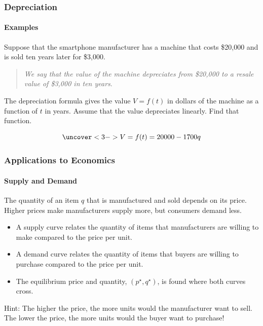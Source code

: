 \documentclass[9pt,xcolor=x11names,compress]{beamer}
\begin{document}
\begin{frame}
\frametitle{Depreciation}
\framesubtitle{Examples}
\begin{example}
Suppose that the smartphone manufacturer has a machine that costs \$20,000 and is sold ten years later for \$3,000.  
\begin{quote}
\emph{We say that the value of the machine depreciates from \$20,000 to a resale value of \$3,000 in ten years}. 
\end{quote}
The depreciation formula gives the value $V=f(t)$ in dollars of the machine as a function of $t$ in years.  Assume that the value depreciates linearly.  Find that function.
\end{example}
\begin{equation*}
\uncover<3->{V=f(t)=20000-1700q}
\end{equation*}
\end{frame}

\begin{frame}\frametitle{Applications to Economics}
\framesubtitle{Supply and Demand}
The quantity of an item $q$ that is manufactured  and sold depends on its price.  Higher prices make manufacturers supply more, but consumers demand less.
\begin{itemize}
\item A \alert{supply curve} relates the quantity of items that manufacturers are willing to make compared to the \alert{price per unit}.
\item A \alert{demand curve} relates the quantity of items that buyers are willing to purchase compared to the \alert{price per unit}.
\item The \alert{equilibrium price and quantity}, $(p^\star, q^\star)$, is found where both curves cross.
\end{itemize}

\pause
\alert{Hint:} The higher the price, the more units would the manufacturer want to sell.  The lower the price, the more units would the buyer want to purchase!

\end{frame}
\end{document}
